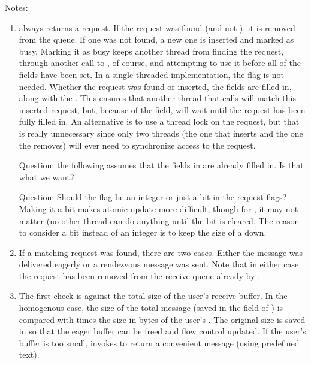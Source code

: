 Notes:
\begin{enumerate}
\item {} always returns a request.  If the
  request was found (and not ), it is removed from the queue.  If
  one was not found, a new one is inserted and marked as busy.
  Marking it as busy 
  keeps another thread from finding the request, through another call to
  , of course, and attempting to use it before
  all of the fields have been set.  In a single threaded implementation, the
   flag is not needed.  
  Whether the request was found or inserted, 
  the  fields are filled in, along with the .
  This ensures that another thread that calls 
  will match this inserted request, but, because of the
   field,
  will wait until the request has been fully filled in.  An alternative is to
  use a thread lock on the request, but that is really unnecessary since only
  two threads (the one that inserts and the one the removes) will ever need to
  synchronize access to the request.

  Question: the following assumes that the fields in
   are already filled in.  Is that what we want?

  Question: Should the  flag be an integer or just a bit in the
  request flags?  Making it a bit makes atomic update more difficult, though
  for , it may not matter (no other thread can do anything until
  the  bit is cleared.  The reason to consider a bit instead of an
  integer is to keep the size of a  down.  

\item If a matching request was found, there are two cases.  Either the
  message was delivered eagerly or a rendezvous message was sent. Note that
  in either case the request has been removed from the receive queue already 
  by .

\item The first check is against the total size of the user's receive buffer.
  In the homogenous case, the size of the total message (saved in the
   field of ) is
  compared with  times the size in bytes of the user's
  .  The original size is saved in  so that the
  eager buffer can be freed and flow control updated.
  If the user's buffer is too small, invokes 
  to return a convenient message (using predefined text).


\end{enumerate}
